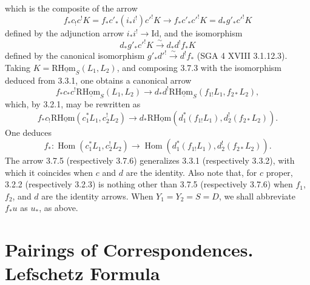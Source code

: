 \documentclass[11pt]{article}
\DeclareMathOperator{\Hom}{Hom}
\providecommand{\Id}{\mathrm{Id}}
\providecommand{\Hom}{\operatorname{Hom}}
\providecommand{\Hom}{\operatorname{Hom}}
\begin{document}
which is the composite of the arrow
\[
f_*c_!c^!K=f_*c'_*(i_*i^!)c'^!K\longrightarrow f_*c'_*c'^!K=d_*g'_*c'^!K
\]
defined by the adjunction arrow $i_*i^!\to\Id$, and the isomorphism
\[
d_*g'_*c'^!K\xrightarrow{\sim}d_*d^!f_*K
\]
defined by the canonical isomorphism $g'_*d'^!\xrightarrow{\sim}d^!f_*$ (SGA 4 XVIII 3.1.12.3). Taking $K=\mathrm{R}\underline{\mathrm{Hom}}_S(L_1,L_2)$, and composing 3.7.3 with the isomorphism deduced from 3.3.1, one obtains a canonical arrow
\begin{equation}
f_*c_*c^!\mathrm{R}\underline{\mathrm{Hom}}_S(L_1,L_2)
\longrightarrow
 d_*d^!\mathrm{R}\underline{\mathrm{Hom}}_S(f_{1!}L_1,f_{2*}L_2),
\tag{3.7.4}
\end{equation}
which, by 3.2.1, may be rewritten as
\begin{equation}
f_*c_!\mathrm{R}\underline{\mathrm{Hom}}(c_1^*L_1,c_2^!L_2)
\longrightarrow
 d_*\mathrm{R}\underline{\mathrm{Hom}}(d_1^*(f_{1!}L_1),d_2^!(f_{2*}L_2)).
\tag{3.7.5}
\end{equation}
One deduces
\begin{equation}
f_*:\Hom(c_1^*L_1,c_2^!L_2)
\longrightarrow
\Hom(d_1^*(f_{1!}L_1),d_2^!(f_{2*}L_2)).
\tag{3.7.6}
\end{equation}
The arrow 3.7.5 (respectively 3.7.6) generalizes 3.3.1 (respectively 3.3.2), with which it coincides when $c$ and $d$ are the identity. Also note that, for $c$ proper, 3.2.2 (respectively 3.2.3) is nothing other than 3.7.5 (respectively 3.7.6) when $f_1$, $f_2$, and $d$ are the identity arrows. When $Y_1=Y_2=S=D$, we shall abbreviate $f_*u$ as $u_*$, as above.

\section{Pairings of Correspondences. Lefschetz Formula}
\end{document}
